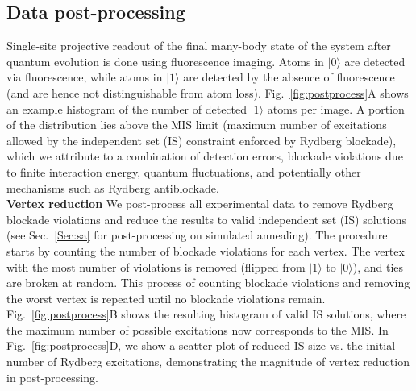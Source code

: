 \documentclass[twocolumn,amssymb,secnumarabic, prl, aps, nofootinbib]{revtex4-1}
\begin{document}
\subsection{Data post-processing \label{Sec:post}}

Single-site projective readout of the final many-body state of the system after quantum evolution is done using fluorescence imaging. Atoms in $|0\rangle$ are detected via fluorescence, while atoms in $|1\rangle$ are detected by the absence of fluorescence (and are hence not distinguishable from atom loss). Fig.~\ref{fig:postprocess}A shows an example histogram of the number of detected $|1\rangle$ atoms per image. A portion of the distribution lies above the MIS limit (maximum number of excitations allowed by the independent set (IS) constraint enforced by Rydberg blockade), which we attribute to a combination of detection errors, blockade violations due to finite interaction energy, quantum fluctuations, and potentially other mechanisms such as Rydberg antiblockade.\\

\noindent\textbf{Vertex reduction} We post-process all experimental data to remove Rydberg blockade violations and reduce the results to valid independent set (IS) solutions (see Sec.~\ref{Sec:sa} for post-processing on simulated annealing). The procedure starts by counting the number of blockade violations for each vertex. The vertex with the most number of violations is removed (flipped from $|1\rangle$ to $|0\rangle$), and ties are broken at random. This process of counting blockade violations and removing the worst vertex is repeated until no blockade violations remain. Fig.~\ref{fig:postprocess}B shows the resulting histogram of valid IS solutions, where the maximum number of possible excitations now corresponds to the MIS. In Fig.~\ref{fig:postprocess}D, we show a scatter plot of reduced IS size vs. the initial number of Rydberg excitations, demonstrating the magnitude of vertex reduction in post-processing.\\
\end{document}
